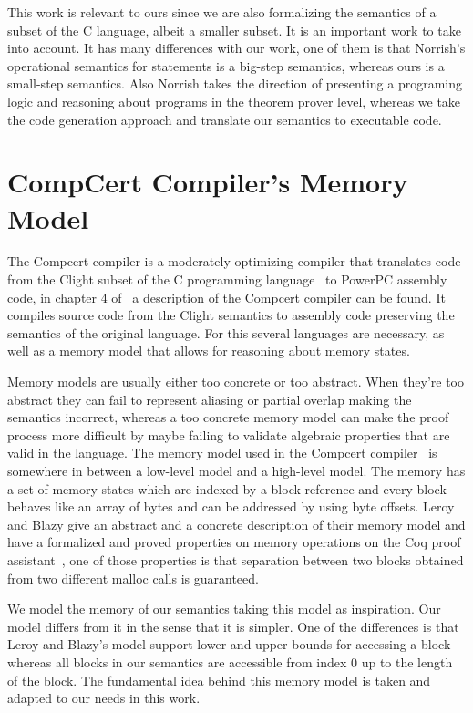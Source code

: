 This work is relevant to ours since we are also formalizing the semantics of a subset of the C language, albeit a smaller subset.
It is an important work to take into account.
It has many differences with our work, one of them is that Norrish's operational semantics for statements is a big-step semantics, whereas ours is a small-step semantics.
Also Norrish takes the direction of presenting a programing logic and reasoning about programs in the theorem prover level, whereas we take the code generation approach and translate our semantics to executable code.


\section{CompCert Compiler's Memory Model}

The Compcert compiler is a moderately optimizing compiler that translates code from the Clight subset of the C programming language~\parencite{clight} to PowerPC assembly code, in chapter 4 of~\parencite{compcert-float-point} a description of the Compcert compiler can be found.
It compiles source code from the Clight semantics to assembly code preserving the semantics of the original language.
For this several languages are necessary, as well as a memory model that allows for reasoning about memory states.

Memory models are usually either too concrete or too abstract.
When they're too abstract they can fail to represent aliasing or partial overlap making the semantics incorrect, whereas a too concrete memory model can make the proof process more difficult by maybe failing to validate algebraic properties that are valid in the language.
The memory model used in the Compcert compiler~\parencite{leroy-blazy-memory-model} is somewhere in between a low-level model and a high-level model.
The memory has a set of memory states which are indexed by a block reference and every block behaves like an array of bytes and can be addressed by using byte offsets.
Leroy and Blazy give an abstract and a concrete description of their memory model and have a formalized and proved properties on memory operations on the Coq proof assistant~\parencite{coq-doc}, one of those properties is that separation between two blocks obtained from two different malloc calls is guaranteed.

We model the memory of our semantics taking this model as inspiration.
Our model differs from it in the sense that it is simpler.
One of the differences is that Leroy and Blazy's model support lower and upper bounds for accessing a block whereas all blocks in our semantics are accessible from index $0$ up to the length of the block.
The fundamental idea behind this memory model is taken and adapted to our needs in this work.


